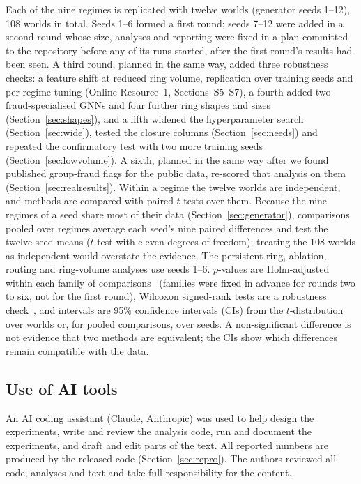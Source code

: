 \documentclass[pdflatex,sn-vancouver-num]{sn-jnl}
\newcommand{\SSecShift}{S5}\newcommand{\STabShift}{S4}
\newcommand{\SSecRegime}{S7}\newcommand{\STabRegime}{S6}
\begin{document}
Each of the nine regimes is replicated with twelve worlds (generator seeds
1--12), 108 worlds in total. Seeds 1--6 formed a first round; seeds 7--12
were added in a second round whose size, analyses and reporting were fixed in
a plan committed to the repository before any of its runs started, after the
first round's results had been seen. A third round, planned in the same way,
added three robustness checks: a feature shift at reduced ring volume,
replication over training seeds and per-regime tuning (Online Resource~1,
Sections~\SSecShift--\SSecRegime), a fourth added two fraud-specialised
GNNs and four further ring shapes and sizes (Section~\ref{sec:shapes}), and a
fifth widened the hyperparameter search (Section~\ref{sec:wide}), tested the
closure columns (Section~\ref{sec:needs}) and repeated the confirmatory test
with two more training seeds (Section~\ref{sec:lowvolume}). A sixth, planned in
the same way after we found published group-fraud flags for the public data,
re-scored that analysis on them (Section~\ref{sec:realresults}).
Within a regime the twelve worlds are
independent, and methods are compared with paired $t$-tests over them.
Because the nine regimes of a seed share most of their data
(Section~\ref{sec:generator}), comparisons pooled over regimes average each
seed's nine paired differences and test the twelve seed means ($t$-test with
eleven degrees of freedom); treating the 108 worlds as independent would
overstate the evidence. The persistent-ring, ablation, routing and
ring-volume analyses use seeds 1--6. $p$-values are
Holm-adjusted within each family of comparisons~\cite{holm1979} (families were fixed in advance for rounds two to six, not for the first round), Wilcoxon signed-rank tests are a robustness
check~\cite{demsar2006}, and intervals are 95\% confidence intervals (CIs)
from the $t$-distribution over worlds or, for pooled comparisons, over seeds.
A non-significant difference is not evidence that two methods are
equivalent; the CIs show which differences remain compatible with the data.

\subsection{Use of AI tools}\label{sec:aitools}
An AI coding assistant (Claude, Anthropic) was used to help design the
experiments, write and review the analysis code, run and document the
experiments, and draft and edit parts of the text. All reported numbers are produced by the released code
(Section~\ref{sec:repro}). The authors reviewed all code, analyses and text
and take full responsibility for the content.
\end{document}
